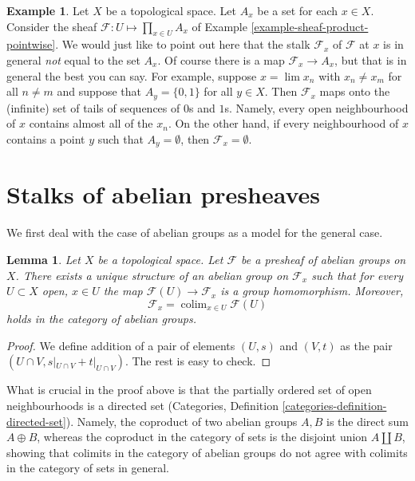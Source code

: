 \documentclass{stacks-project}
\theoremstyle{plain}
\newtheorem{lemma}[subsection]{Lemma}
\theoremstyle{definition}
\newtheorem{example}[subsection]{Example}
\theoremstyle{remark}
\numberwithin{equation}{subsection}
\def\lim{\mathop{\mathrm{lim}}\nolimits}
\def\colim{\mathop{\mathrm{colim}}\nolimits}
\begin{document}
\begin{example}
\label{example-sheaf-product-pointwise-stalk}
Let $X$ be a topological space. Let $A_x$ be a set for each $x \in X$.
Consider the sheaf $\mathcal{F} : U \mapsto \prod_{x\in U} A_x$ of Example
\ref{example-sheaf-product-pointwise}. We would just like to point
out here that the stalk $\mathcal{F}_x$ of $\mathcal{F}$ at $x$
is in general {\it not} equal to the set $A_x$. Of course there is
a map $\mathcal{F}_x \to A_x$, but that is in general the best you
can say. For example, suppose $x = \lim x_n$ with $x_n \not = x_m$ for
all $n \not = m$ and suppose that $A_y = \{0, 1\}$ for all $y \in X$. Then
$\mathcal{F}_x$ maps onto the (infinite) set of tails of sequences
of $0$s and $1$s. Namely, every open neighbourhood of $x$ contains almost
all of the $x_n$. On the other hand, if every neighbourhood of $x$ contains
a point $y$ such that $A_y = \emptyset$, then $\mathcal{F}_x = \emptyset$.
\end{example}



\section{Stalks of abelian presheaves}
\label{section-stalks-abelian-presheaves}

\noindent
We first deal with the case of abelian groups as
a model for the general case.

\begin{lemma}
\label{lemma-stalk-abelian-presheaf}
Let $X$ be a topological space. Let $\mathcal{F}$ be a presheaf
of abelian groups on $X$. There exists a unique structure of an
abelian group on $\mathcal{F}_x$ such that for every
$U \subset X$ open, $x\in U$ the map $\mathcal{F}(U) \to \mathcal{F}_x$
is a group homomorphism. Moreover,
$$
\mathcal{F}_x
=
\colim_{x\in U} \mathcal{F}(U)
$$
holds in the category of abelian groups.
\end{lemma}

\begin{proof}
We define addition of a pair of elements
$(U, s)$ and $(V, t)$ as the pair $(U \cap V, s|_{U\cap V} +
t|_{U \cap V})$. The rest is easy to check.
\end{proof}

\noindent
What is crucial in the proof above is that the partially ordered set of open
neighbourhoods is a directed set (Categories, Definition
\ref{categories-definition-directed-set}). Namely, the coproduct
of two abelian groups $A, B$ is the direct sum $A \oplus B$, whereas
the coproduct in the category of sets is the disjoint
union $A \amalg B$, showing that colimits in the category
of abelian groups do not agree with colimits in the
category of sets in general.
\end{document}
